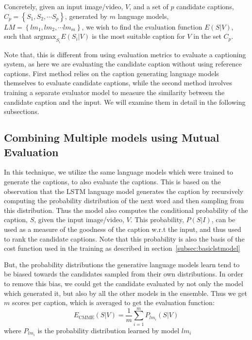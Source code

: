Concretely, given an input image/video, $V$, and a set of $p$ candidate
captions, $C_p = \left\{S_1,S_2,\cdots S_p \right\}$, generated by $m$ language
models, $LM = \left\{lm_1,lm_2,\cdots lm_m \right\}$, we wish to find the
evaluation function $E(S|V)$, such that $\text{argmax}_{S_i} E(S_i|V)$ is the
most suitable caption for $V$ in the set $C_p$.

Note that, this is different from using evaluation metrics to evaluate a
captioning system, as here we are evaluating the candidate caption without using
reference captions.
First method relies on the caption generating language models themselves to
evaluate candidate captions, while the second method involves training a
separate evaluator model to measure the similarity between the candidate caption
and the input.
We will examine them in detail in the following subsections.

\subsection{Combining Multiple models using Mutual Evaluation}

In this technique, we utilize the same language models which were trained to generate
the captions, to also evaluate the captions.
This is based on the observation that the LSTM language model generates the
caption by recursively computing the probability distribution of the next word
and then sampling from this distribution.
Thus the model also computes the conditional probability of the caption, $S$,
given the input image/video, $V$.
This probability, $P(S|I)$, can be used as a measure of the goodness of the
caption w.r.t the input, and thus used to rank the candidate captions.
Note that this probability is also the basis of the cost function used in the
training as described in section~\ref{subsec:basiclstmodel}

But, the probability distributions the generative language models learn tend to
be biased towards the candidates sampled from their own distributions.
In order to remove this bias, we could get the candidate evaluated by not only
the model which generated it, but also by all the other models in the ensemble.
Thus we get $m$ scores per caption, which is averaged to get the evaluation
function:
\begin{equation}
  \label{eq:cmme} 
  E_{\text{CMME}}(S|V) = \frac{1}{m}\sum_{i=1}^{m} P_{lm_i}(S | V)
\end{equation}
\noindent where $P_{lm_i}$ is the probability distribution learned by model
$lm_i$

